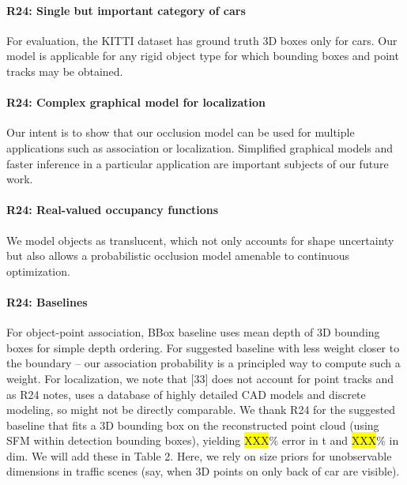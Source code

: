 \documentclass[10pt,twocolumn,letterpaper]{article}
\newcommand{\hili}[1]{\colorbox{yellow}{#1}}
\begin{document}
\vspace{-0.4cm}
\paragraph{R24: Single but important category of cars} For evaluation, the KITTI dataset has ground truth 3D boxes only for cars. Our model is applicable for any rigid object type for which bounding boxes and point tracks may be obtained.


\vspace{-0.4cm}
\paragraph{R24: Complex graphical model for localization} 
Our intent is to show that our occlusion model can be used for multiple applications such as association or localization. Simplified graphical models and faster inference in a particular application are important subjects of our future work.

\vspace{-0.4cm}
\paragraph{R24: Real-valued occupancy functions}
We model objects as translucent, which not only accounts for shape uncertainty but also allows a probabilistic occlusion model amenable to continuous optimization.

\vspace{-0.4cm}
\paragraph{R24: Baselines}
For object-point association, BBox baseline uses mean depth of 3D bounding boxes for simple depth ordering. For suggested baseline with less weight closer to the boundary -- our association probability is a principled way to compute such a weight. For localization, we note that [33] does not account for point tracks and as R24 notes, uses a database of highly detailed CAD models and discrete modeling, so might not be directly comparable. We thank R24 for the suggested baseline that fits a 3D bounding box on the reconstructed point cloud (using SFM within detection bounding boxes), yielding \hili{XXX}\% error in t and \hili{XXX}\% in dim. We will add these in Table 2.
Here, we rely on size priors for unobservable dimensions in traffic scenes (say, when 3D points on only back of car are visible).
\end{document}

